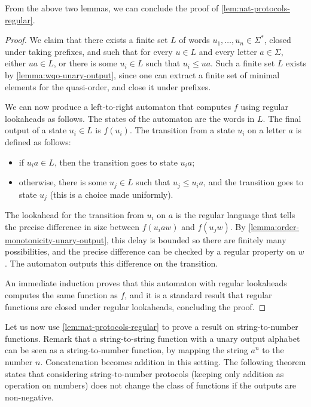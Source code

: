 From the above two lemmas, we can conclude the proof of
\cref{lem:nat-protocols-regular}. 

\begin{proof}
  We claim that there exists a finite set $L$ of words $u_1, \ldots, u_n \in
  \Sigma^*$, closed under taking prefixes, and such that for every $u \in L$
  and every letter $a \in \Sigma$, either $ua \in L$, or there is some $u_i \in
  L$ such that $u_i \leq ua$. 
  Such a finite set $L$ exists by \cref{lemma:wqo-unary-output}, since one can
  extract a finite set of minimal elements for the quasi-order, and close it
  under prefixes. 

  We can now produce a left-to-right automaton that computes $f$ using regular
  lookaheads as follows. The states of the automaton are the words in $L$.
  The final output of a state $u_i \in L$ is $f(u_i)$.
  The transition from a state $u_i$ on a letter $a$ is defined as follows:
  \begin{itemize}
    \item if $u_i a \in L$, then the transition goes to state $u_i a$;
    \item otherwise, there is some $u_j \in L$ such that $u_j \leq u_i a$,
      and the transition goes to state $u_j$ (this is a choice made uniformly).
  \end{itemize}
  The lookahead for the transition from $u_i$ on $a$ is the regular language
  that tells the precise difference in size between $f(u_i a w)$ and $f(u_j w)$. By
  \cref{lemma:order-monotonicity-unary-output}, this delay is bounded so there 
  are finitely many possibilities, and the precise difference can be checked by a
  regular property on $w$. The automaton outputs this difference on the
  transition.

  An immediate induction proves that this automaton with regular lookaheads
  computes the same function as $f$, and it is a standard result that 
  regular functions are closed under regular lookaheads,
  concluding the proof.
\end{proof}


Let us now use \cref{lem:nat-protocols-regular} to prove a result on
string-to-number functions. Remark that a string-to-string function with a
unary output alphabet can be seen as a string-to-number function, by mapping
the string $a^n$ to the number $n$. Concatenation becomes addition in this
setting. The following theorem states that considering string-to-number
protocols (keeping only addition as operation on numbers) does not change the
class of functions if the outputs are non-negative.

